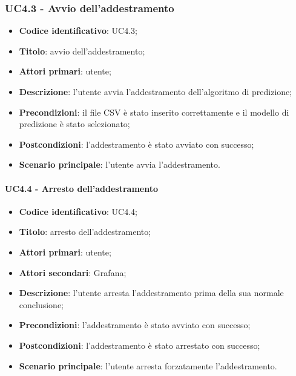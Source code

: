 \subsubsection{UC4.3 - Avvio dell'addestramento}
\begin{itemize}
    \item \textbf{Codice identificativo}: UC4.3;
    \item \textbf{Titolo}: avvio dell'addestramento;
    \item \textbf{Attori primari}: utente;
    \item \textbf{Descrizione}: l'utente avvia l'addestramento dell'algoritmo di predizione;
    \item \textbf{Precondizioni}: il file CSV è stato inserito correttamente e il modello di predizione è stato selezionato;
    \item \textbf{Postcondizioni}: l'addestramento è stato avviato con successo;
    \item \textbf{Scenario principale}: l'utente avvia l'addestramento.
\end{itemize}

\paragraph{UC4.4 - Arresto dell'addestramento}
\begin{itemize}
	\item \textbf{Codice identificativo}: UC4.4;
	\item \textbf{Titolo}: arresto dell'addestramento;
	\item \textbf{Attori primari}: utente;
	\item \textbf{Attori secondari}: Grafana\glo;
	\item \textbf{Descrizione}: l'utente arresta l'addestramento prima della sua normale conclusione;
	\item \textbf{Precondizioni}: l'addestramento è stato avviato con successo;
	\item \textbf{Postcondizioni}: l'addestramento è stato arrestato con successo;
	\item \textbf{Scenario principale}: l'utente arresta forzatamente l'addestramento.
\end{itemize}

